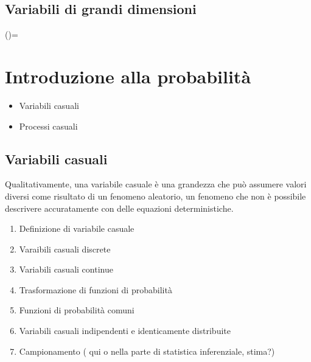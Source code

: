 \documentclass[letterpaper,10pt,italian]{jupyterBook}
\begin{document}
\section{Variabili di grandi dimensioni}
\label{\detokenize{ch/statistics/descriptive:variabili-di-grandi-dimensioni}}
\sphinxstepscope

\sphinxAtStartPar
()=


\chapter{Introduzione alla probabilità}
\label{\detokenize{ch/statistics/probability:introduzione-alla-probabilita}}\label{\detokenize{ch/statistics/probability::doc}}\begin{itemize}
\item {} 
\sphinxAtStartPar
Variabili casuali

\item {} 
\sphinxAtStartPar
Processi casuali

\end{itemize}

\sphinxstepscope


\section{Variabili casuali}
\label{\detokenize{ch/statistics/random_variables:variabili-casuali}}\label{\detokenize{ch/statistics/random_variables:statistics-hs-random-variables}}\label{\detokenize{ch/statistics/random_variables::doc}}
\sphinxAtStartPar
Qualitativamente, una variabile casuale è una grandezza che può assumere valori diversi come risultato di un fenomeno aleatorio, un fenomeno che non è possibile descrivere accuratamente con delle equazioni deterministiche.  

\sphinxAtStartPar
{}
\begin{enumerate}
%
\item {} 
\sphinxAtStartPar
Definizione di variabile casuale

\item {} 
\sphinxAtStartPar
Varaibili casuali discrete

\item {} 
\sphinxAtStartPar
Variabili casuali continue

\item {} 
\sphinxAtStartPar
Trasformazione di funzioni di probabilità

\item {} 
\sphinxAtStartPar
Funzioni di probabilità comuni

\item {} 
\sphinxAtStartPar
Variabili casuali indipendenti e identicamente distribuite

\item {} 
\sphinxAtStartPar
Campionamento ( qui o nella parte di statistica inferenziale, stima?)

\end{enumerate}
\end{document}
